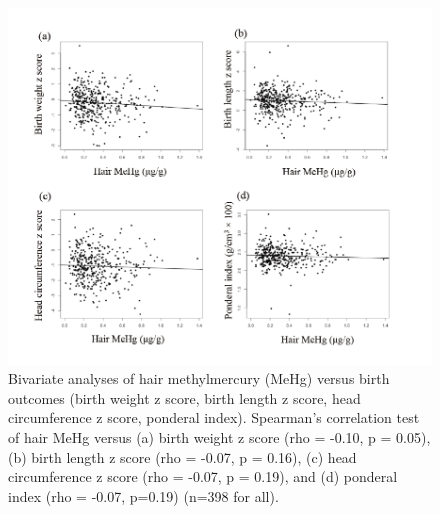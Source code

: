 \begin{figure}
  \centering
    \label{fig:Fig315}
  \includegraphics[scale=1]{Figures/Fig315.pdf}
  \caption[Bivariate analyses of hair methylmercury versus birth outcomes (birth weight z score, birth length z score, head circumference z score, ponderal index)]{Bivariate analyses of hair methylmercury (MeHg) versus birth outcomes (birth weight z score, birth length z score, head circumference z score, ponderal index). Spearman's correlation test of hair MeHg versus (a) birth weight z score (rho = -0.10, p = 0.05), (b) birth length z score (rho = -0.07, p = 0.16), (c) head circumference z score (rho = -0.07, p = 0.19), and (d) ponderal index (rho = -0.07, p=0.19) (n=398 for all).}
\end{figure}


